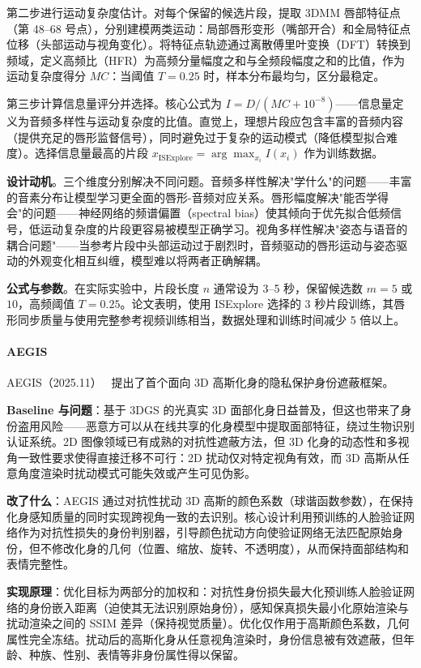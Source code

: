 第二步进行运动复杂度估计。对每个保留的候选片段，提取 3DMM 唇部特征点（第 48--68 号点），分别建模两类运动：局部唇形变形（嘴部开合）和全局特征点位移（头部运动与视角变化）。将特征点轨迹通过离散傅里叶变换（DFT）转换到频域，定义高频比（HFR）为高频分量幅度之和与全频段幅度之和的比值，作为运动复杂度得分 $MC$：当阈值 $T = 0.25$ 时，样本分布最均匀，区分最稳定。

第三步计算信息量评分并选择。核心公式为 $I = D / (MC + 10^{-8})$——信息量定义为音频多样性与运动复杂度的比值。直觉上，理想片段应包含丰富的音频内容（提供充足的唇形监督信号），同时避免过于复杂的运动模式（降低模型拟合难度）。选择信息量最高的片段 $x_{\text{ISExplore}} = \arg\max_{x_i} I(x_i)$ 作为训练数据。

\textbf{设计动机}。三个维度分别解决不同问题。音频多样性解决"学什么"的问题——丰富的音素分布让模型学习更全面的唇形-音频对应关系。唇形幅度解决"能否学得会"的问题——神经网络的频谱偏置（spectral bias）使其倾向于优先拟合低频信号，低运动复杂度的片段更容易被模型正确学习。视角多样性解决"姿态与语音的耦合问题"——当参考片段中头部运动过于剧烈时，音频驱动的唇形运动与姿态驱动的外观变化相互纠缠，模型难以将两者正确解耦。

\textbf{公式与参数}。在实际实验中，片段长度 $n$ 通常设为 3--5 秒，保留候选数 $m = 5$ 或 $10$，高频阈值 $T = 0.25$。论文表明，使用 ISExplore 选择的 3 秒片段训练，其唇形同步质量与使用完整参考视频训练相当，数据处理和训练时间减少 5 倍以上。

\paragraph{AEGIS}

AEGIS（2025.11）~\cite{2511_17747} 提出了首个面向 3D 高斯化身的隐私保护身份遮蔽框架。

\textbf{Baseline 与问题}：基于 3DGS 的光真实 3D 面部化身日益普及，但这也带来了身份盗用风险——恶意方可以从在线共享的化身模型中提取面部特征，绕过生物识别认证系统。2D 图像领域已有成熟的对抗性遮蔽方法，但 3D 化身的动态性和多视角一致性要求使得直接迁移不可行：2D 扰动仅对特定视角有效，而 3D 高斯从任意角度渲染时扰动模式可能失效或产生可见伪影。

\textbf{改了什么}：AEGIS 通过对抗性扰动 3D 高斯的颜色系数（球谐函数参数），在保持化身感知质量的同时实现跨视角一致的去识别。核心设计利用预训练的人脸验证网络作为对抗性损失的身份判别器，引导颜色扰动方向使验证网络无法匹配原始身份，但不修改化身的几何（位置、缩放、旋转、不透明度），从而保持面部结构和表情完整性。

\textbf{实现原理}：优化目标为两部分的加权和：对抗性身份损失最大化预训练人脸验证网络的身份嵌入距离（迫使其无法识别原始身份），感知保真损失最小化原始渲染与扰动渲染之间的 SSIM 差异（保持视觉质量）。优化仅作用于高斯颜色系数，几何属性完全冻结。扰动后的高斯化身从任意视角渲染时，身份信息被有效遮蔽，但年龄、种族、性别、表情等非身份属性得以保留。

